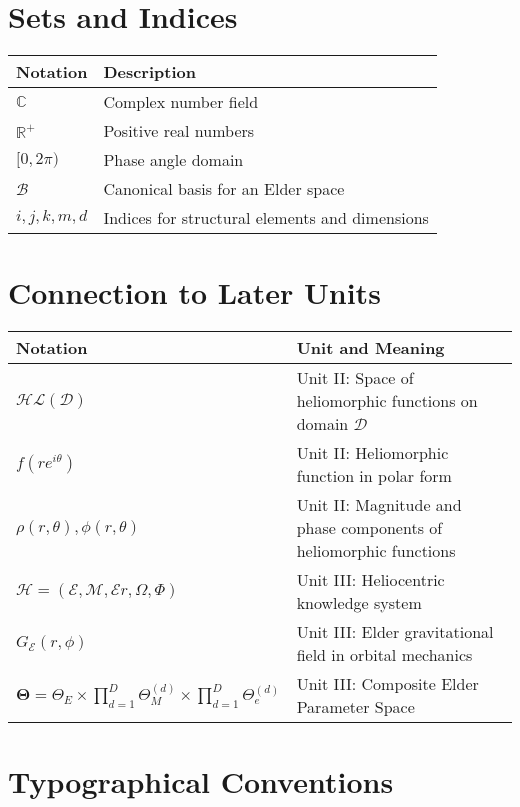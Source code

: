 \section*{Sets and Indices}

\begin{tabular}{p{}p{}}
\textbf{Notation} & \textbf{Description} \\
\hline
$\mathbb{C}$ & Complex number field \\
$\mathbb{R}^+$ & Positive real numbers \\
$[0, 2\pi)$ & Phase angle domain \\
$\mathcal{B}$ & Canonical basis for an Elder space \\
$i, j, k, m, d$ & Indices for structural elements and dimensions \\
\hline
\end{tabular}

\section*{Connection to Later Units}

\begin{tabular}{p{}p{}}
\textbf{Notation} & \textbf{Unit and Meaning} \\
\hline
$\mathcal{HL}(\mathcal{D})$ & Unit II: Space of heliomorphic functions on domain $\mathcal{D}$ \\
$f(re^{i\theta})$ & Unit II: Heliomorphic function in polar form \\
$\rho(r,\theta), \phi(r,\theta)$ & Unit II: Magnitude and phase components of heliomorphic functions \\
$\mathcal{H} = (\mathcal{E}, \mathcal{M}, \mathcal{E}r, \Omega, \Phi)$ & Unit III: Heliocentric knowledge system \\
$G_{\mathcal{E}}(r, \phi)$ & Unit III: Elder gravitational field in orbital mechanics \\
$\boldsymbol{\Theta} = \Theta_E \times \prod_{d=1}^D \Theta_M^{(d)} \times \prod_{d=1}^D \Theta_e^{(d)}$ & Unit III: Composite Elder Parameter Space \\
\hline
\end{tabular}

\section*{Typographical Conventions}

